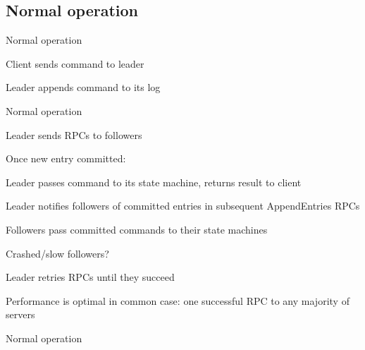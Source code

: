 \subsection{Normal operation}


\begin{frame}{Normal operation}
\BIL
\item Client sends command to leader
\item Leader appends command to its log
\EIL

\begin{Procedure}
\caption{Normal operation code executed by process $p$}
\end{Procedure}

\end{frame}

\begin{frame}{Normal operation}
\BIL
\item Leader sends \AppendRPC RPCs to followers
\item Once new entry committed:
	\BI
	\item Leader passes command to its state machine, returns result to client
	\item Leader notifies followers of committed entries in subsequent AppendEntries RPCs
	\item Followers pass committed commands to their state machines
	\EI
\item Crashed/slow followers?
	\BI
	\item Leader retries RPCs until they succeed
	\item Performance is optimal in common case: one successful RPC to any majority of servers
	\EI
\EIL

\end{frame}

\begin{frame}{Normal operation}

\begin{Procedure}
\caption{RPC timeout code executed by process $p$}
\end{Procedure}
\end{frame}



